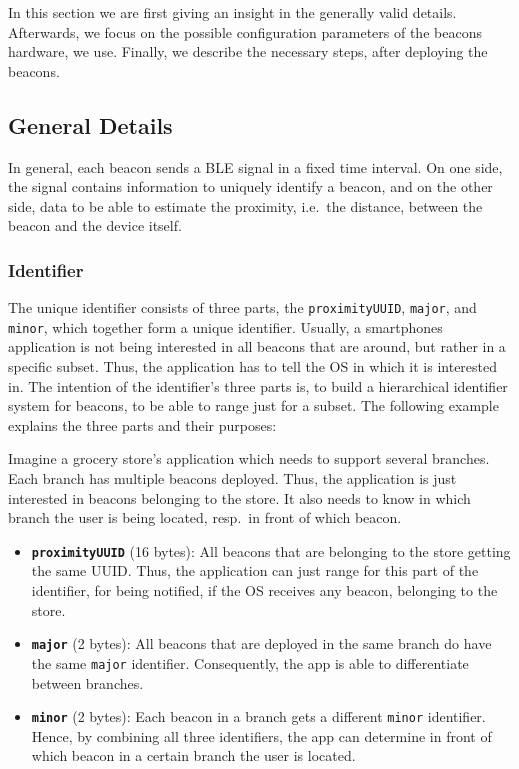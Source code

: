 In this section we are first giving an insight in the generally valid details. Afterwards, we focus on the possible configuration parameters of the beacons hardware, we use. Finally, we describe the necessary steps, after deploying the beacons.

\subsection{General Details}
In general, each beacon sends a \acs{BLE} signal in a fixed time interval. On one side, the signal contains information to uniquely identify a beacon, and on the other side, data to be able to estimate the proximity, i.e.\ the distance, between the beacon and the device itself.

\subsubsection*{Identifier}
The unique identifier consists of three parts, the \texttt{proximityUUID}, \texttt{major}, and \texttt{minor}, which together form a unique identifier. Usually, a smartphones application is not being interested in all beacons that are around, but rather in a specific subset. Thus, the application has to tell the \ac{OS} in which it is interested in. The intention of the identifier's three parts is, to build a hierarchical identifier system for beacons, to be able to range just for a subset. The following example explains the three parts and their purposes:

Imagine a grocery store's application which needs to support several branches. Each branch has multiple beacons deployed. Thus, the application is just interested in beacons belonging to the store. It also needs to know in which branch the user is being located, resp.\ in front of which beacon.

\begin{itemize}
  \item \textbf{\texttt{proximityUUID}} (16 bytes): All beacons that are belonging to the store getting the same \acl{UUID}. Thus, the application can just range for this part of the identifier, for being notified, if the \ac{OS} receives any beacon, belonging to the store.
  \item \textbf{\texttt{major}} (2 bytes): All beacons that are deployed in the same branch do have the same \texttt{major} identifier. Consequently, the app is able to differentiate between branches.
  \item \textbf{\texttt{minor}} (2 bytes): Each beacon in a branch gets a different \texttt{minor} identifier. Hence, by combining all three identifiers, the app can determine in front of which beacon in a certain branch the user is located.
\end{itemize}

